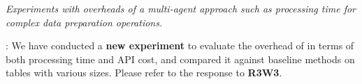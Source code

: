 \begin{shaded}
{ 
\emph{Experiments with overheads of a multi-agent approach such as processing time for complex data preparation operations.}
}
\end{shaded}

: We have conducted a \textbf{new experiment} to evaluate the overhead of \sys in terms of both processing time and API cost, and compared it against baseline methods on tables with various sizes. Please refer to the response to \textbf{R3W3}.

